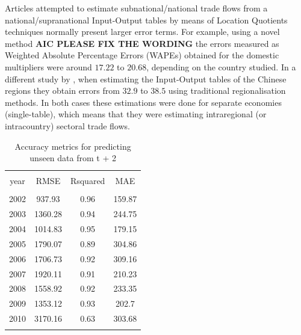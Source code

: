 \documentclass[]{interact}
\theoremstyle{plain}%
\theoremstyle{definition}
\theoremstyle{remark}
\begin{document}
Articles attempted to estimate subnational/national trade flows from a
national/supranational Input-Output tables by means of Location
Quotients techniques normally present larger error terms. For example,
\citet{pereira2020bidimensional} using a novel method \textbf{AIC PLEASE
FIX THE WORDING} the errors measured as Weighted Absolute Percentage
Errors (WAPEs) obtained for the domestic multipliers were around
\(17.22\) to \(20.68\), depending on the country studied. In a different
study by \citet{jiang2012improved}, when estimating the Input-Output
tables of the Chinese regions they obtain errors from \(32.9\) to
\(38.5\) using traditional regionalisation methods. In both cases these
estimations were done for separate economies (single-table), which means
that they were estimating intraregional (or intracountry) sectoral trade
flows.

\begin{table}[!htbp] \centering 
  \caption{Accuracy metrics  for predicting unseen data from t + 2\label{accuracy_test}} 
  \label{} 
\footnotesize 
\begin{tabular}{@{\extracolsep{0pt}} cccc} 
\\[-1.8ex]\hline 
\hline \\[-1.8ex] 
year & RMSE & Rsquared & MAE \\ 
\hline \\[-1.8ex] 
2002 & 937.93 & 0.96 & 159.87 \\ 
2003 & 1360.28 & 0.94 & 244.75 \\ 
2004 & 1014.83 & 0.95 & 179.15 \\ 
2005 & 1790.07 & 0.89 & 304.86 \\ 
2006 & 1706.73 & 0.92 & 309.16 \\ 
2007 & 1920.11 & 0.91 & 210.23 \\ 
2008 & 1558.92 & 0.92 & 233.35 \\ 
2009 & 1353.12 & 0.93 & 202.7 \\ 
2010 & 3170.16 & 0.63 & 303.68 \\ 
\hline \\[-1.8ex] 
\end{tabular} 
\end{table}
\end{document}
